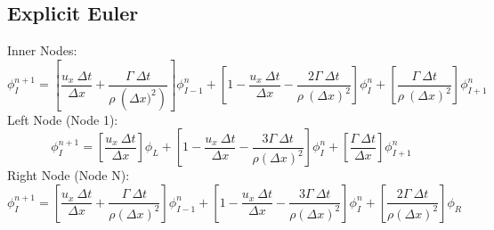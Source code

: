 \documentclass[12pt]{article}
\begin{document}
\subsection{Explicit Euler}
Inner Nodes:
\begin{equation}
    \phi_{I}^{n+1} = \left[ \frac{u_x\: \Delta t}{\Delta x} + \frac{\Gamma\: \Delta t}{\rho\: \left(\Delta x)^2\right)} \right] \phi_{I-1}^{n} + \left[ 1 - \frac{u_x\: \Delta t}{\Delta x} - \frac{2\Gamma\: \Delta t}{\rho\: \left(\Delta x\right)^2} \right] \phi_{I}^{n} + \left[ \frac{\Gamma\:\Delta t}{\rho\: \left(\Delta x\right)^2} \right]\phi_{I+1}^{n}
    \label{eq:ee inner}
\end{equation}
Left Node (Node 1):
\begin{equation}
    \phi_{I}^{n+1} = \left[ \frac{u_x\: \Delta t}{\Delta x} \right]\phi_{L} + \left[ 1 - \frac{u_x\:\Delta t}{\Delta x} - \frac{3\Gamma\:\Delta t}{\rho\left(\Delta x\right)^2} \right]\phi_{I}^{n} + \left[ \frac{\Gamma\:\Delta t}{\Delta x} \right]\phi_{I+1}^{n}
    \label{eq:ee left}
\end{equation}
Right Node (Node N):
\begin{equation}
    \phi_{I}^{n+1} = \left[ \frac{u_x\:\Delta t}{\Delta x} + \frac{\Gamma\:\Delta t}{\rho\left(\Delta x\right)^2} \right]\phi_{I-1}^{n} + \left[ 1 - \frac{u_x\:\Delta t}{\Delta x} - \frac{3\Gamma\:\Delta t}{\rho\left(\Delta x\right)^2} \right]\phi_{I}^{n} + \left[ \frac{2\Gamma\:\Delta t}{\rho\left(\Delta x\right)^2} \right]\phi_{R}
    \label{eq:ee right}
\end{equation}
\end{document}
